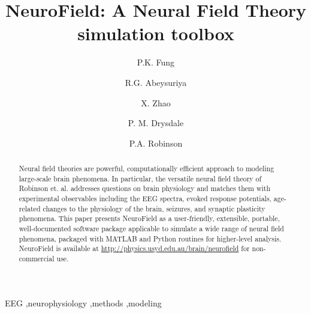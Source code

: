 \documentclass[preprint,review,10pt,authoryear,letterpaper]{elsarticle}
\begin{document}
\begin{frontmatter}

\title{NeuroField: A Neural Field Theory simulation toolbox}


\author{P.K. Fung}
\author{R.G. Abeysuriya\corref{}}
\author{X. Zhao\corref{}}
\author{P. M. Drysdale\corref{}}

\author{P.A. Robinson\corref{}}

\address{School of Physics, University of Sydney, New South Wales, Australia}


\begin{abstract}

Neural field theories are powerful, computationally efficient approach to modeling large-scale brain phenomena. In particular, the versatile neural field theory of Robinson et. al. addresses questions on brain physiology and matches them with experimental observables including the EEG spectra, evoked response potentials, age-related changes to the physiology of the brain, seizures, and synaptic plasticity phenomena. This paper presents NeuroField as a user-friendly, extensible, portable, well-documented software package applicable to simulate a wide range of neural field phenomena, packaged with MATLAB and Python routines for higher-level analysis. NeuroField is %
available at \url{http://physics.usyd.edu.au/brain/neurofield} %
for non-commercial use. 

\end{abstract}

\begin{keyword}
EEG \sep neurophysiology \sep methods \sep modeling

\end{keyword}

\end{frontmatter}
\end{document}
